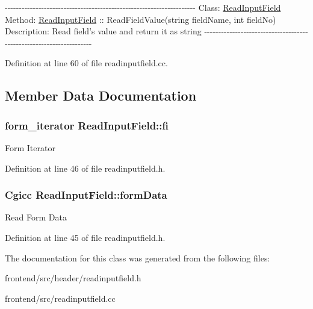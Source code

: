 -\/-\/-\/-\/-\/-\/-\/-\/-\/-\/-\/-\/-\/-\/-\/-\/-\/-\/-\/-\/-\/-\/-\/-\/-\/-\/-\/-\/-\/-\/-\/-\/-\/-\/-\/-\/-\/-\/-\/-\/-\/-\/-\/-\/-\/-\/-\/-\/-\/-\/-\/-\/-\/-\/-\/-\/-\/-\/-\/-\/-\/-\/-\/-\/-\/-\/-\/-\/ \-Class\-: \hyperlink{classReadInputField}{\-Read\-Input\-Field} \-Method\-: \hyperlink{classReadInputField}{\-Read\-Input\-Field} \-:\-: \-Read\-Field\-Value(string field\-Name, int field\-No) \-Description\-: \-Read field's value and return it as string -\/-\/-\/-\/-\/-\/-\/-\/-\/-\/-\/-\/-\/-\/-\/-\/-\/-\/-\/-\/-\/-\/-\/-\/-\/-\/-\/-\/-\/-\/-\/-\/-\/-\/-\/-\/-\/-\/-\/-\/-\/-\/-\/-\/-\/-\/-\/-\/-\/-\/-\/-\/-\/-\/-\/-\/-\/-\/-\/-\/-\/-\/-\/-\/-\/-\/-\/-\/ 

\-Definition at line 60 of file readinputfield.\-cc.



\subsection{\-Member \-Data \-Documentation}
\hypertarget{classReadInputField_ae252dc321be04c2c1afa6928ad16a45d}{
\subsubsection[{fi}]{\setlength{\rightskip}{0pt plus 5cm}form\-\_\-iterator {\bf \-Read\-Input\-Field\-::fi}}}\label{classReadInputField_ae252dc321be04c2c1afa6928ad16a45d}
\-Form \-Iterator 

\-Definition at line 46 of file readinputfield.\-h.

\hypertarget{classReadInputField_a1e4ebac8979fd9b2771320d669fce5fc}{
\subsubsection[{form\-Data}]{\setlength{\rightskip}{0pt plus 5cm}\-Cgicc {\bf \-Read\-Input\-Field\-::form\-Data}}}\label{classReadInputField_a1e4ebac8979fd9b2771320d669fce5fc}
\-Read \-Form \-Data 

\-Definition at line 45 of file readinputfield.\-h.



\-The documentation for this class was generated from the following files\-:\begin{DoxyCompactItemize}
\item 
frontend/src/header/readinputfield.\-h\item 
frontend/src/readinputfield.\-cc\end{DoxyCompactItemize}
